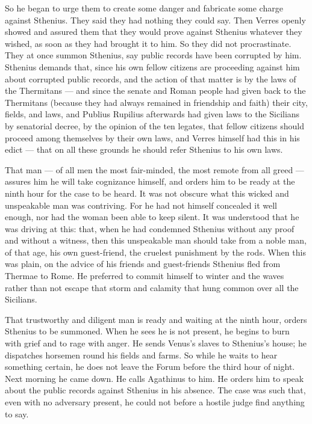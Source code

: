 So he began to urge them to create some danger and fabricate some charge against Sthenius. They said they had nothing they could say. Then Verres openly showed and assured them that they would prove against Sthenius whatever they wished, as soon as they had brought it to him. So they did not procrastinate. They at once summon Sthenius, say public records have been corrupted by him. Sthenius demands that, since his own fellow citizens are proceeding against him about corrupted public records, and the action of that matter is by the laws of the Thermitans --- and since the senate and Roman people had given back to the Thermitans (because they had always remained in friendship and faith) their city, fields, and laws, and Publius Rupilius afterwards had given laws to the Sicilians by senatorial decree, by the opinion of the ten legates, that fellow citizens should proceed among themselves by their own laws, and Verres himself had this in his edict --- that on all these grounds he should refer Sthenius to his own laws.

 That man --- of all men the most fair-minded, the most remote from all greed --- assures him he will take cognizance himself, and orders him to be ready at the ninth hour for the case to be heard. It was not obscure what this wicked and unspeakable man was contriving. For he had not himself concealed it well enough, nor had the woman been able to keep silent. It was understood that he was driving at this: that, when he had condemned Sthenius without any proof and without a witness, then this unspeakable man should take from a noble man, of that age, his own guest-friend, the cruelest punishment by the rods. When this was plain, on the advice of his friends and guest-friends Sthenius fled from Thermae to Rome. He preferred to commit himself to winter and the waves rather than not escape that storm and calamity that hung common over all the Sicilians.

 That trustworthy and diligent man is ready and waiting at the ninth hour, orders Sthenius to be summoned. When he sees he is not present, he begins to burn with grief and to rage with anger. He sends Venus's slaves to Sthenius's house; he dispatches horsemen round his fields and farms. So while he waits to hear something certain, he does not leave the Forum before the third hour of night. Next morning he came down. He calls Agathinus to him. He orders him to speak about the public records against Sthenius in his absence. The case was such that, even with no adversary present, he could not before a hostile judge find anything to say.

